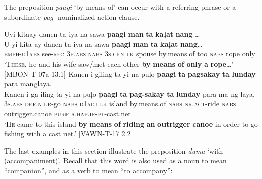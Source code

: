 The preposition \textit{paagi} ‘by means of’ can occur with a referring phrase or a subordinate \textit{pag}{}- nominalized action clause.

\newpage
\ea
Uyi  kitaay  danen  ta  iya  na  sawa \textbf{paagi}  \textbf{man}  \textbf{ta}  \textbf{kaļat}  \textbf{nang} … \\\smallskip
 \gll U-yi  kita-ay  danen  ta  iya  na  sawa \textbf{paagi}  \textbf{man}  \textbf{ta}  \textbf{kaļat}  \textbf{nang}… \\
\textsc{emph}-\textsc{d}1\textsc{abs}  see-\textsc{rec}  3\textsc{p.abs}  \textsc{nabs}  3\textsc{s.gen}  \textsc{lk}  spouse
by.means.of  too  \textsc{nabs}  rope  only \\
\glt `\textsc{These}, he and his wife saw/met each other \textbf{by} \textbf{means} \textbf{of} \textbf{only} \textbf{a} \textbf{rope}…’ [MBON-T-07a 13.1]
\z
\ea
Kanen  i  giling  ta  yi  na  puļo  \textbf{paagi}  \textbf{ta} \textbf{pagsakay}  \textbf{ta}  \textbf{lunday}  para  manglaya. \\\smallskip
 \gll Kanen  i  ga-iling  ta  yi  na  puļo  \textbf{paagi}  \textbf{ta} \textbf{pag-sakay}  \textbf{ta}  \textbf{lunday}  para  ma-ng-laya. \\
3\textsc{s.abs}  \textsc{def.n}  \textsc{i.r}-go  \textsc{nabs}  \textsc{d}1\textsc{adj}  \textsc{lk}  island  by.means.of  \textsc{nabs}
\textsc{nr.act}-ride  \textsc{nabs}  outrigger.canoe  \textsc{purp}  \textsc{a.hap.ir}-\textsc{pl}-cast.net \\
\glt \textsc{‘He} came to this island \textbf{by} \textbf{means} \textbf{of} \textbf{riding} \textbf{an} \textbf{outrigger} \textbf{canoe} in order to go fishing with a cast net.’ [VAWN-T-17 2.2]
\z

The last examples in this section illustrate the preposition \textit{duma} ‘with (accompaniment)’. Recall that this word is also used as a noun to mean “companion”, and as a verb to mean “to accompany”:

